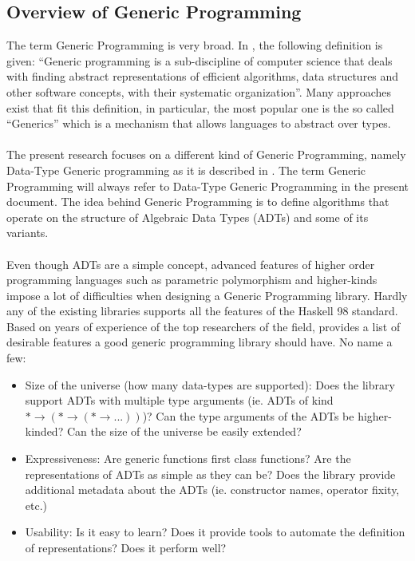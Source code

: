 \documentclass[8pt]{extarticle}
\begin{document}
\subsection{Overview of Generic Programming}
The term Generic Programming is very broad. In \cite{GenLangComp}, the following definition is given: ``Generic programming is a sub-discipline of computer science that deals with finding abstract representations of efficient algorithms, data structures and other software concepts, with their systematic organization''. Many approaches exist that fit this definition, in particular, the most popular one is the so called ``Generics''\cite{GenLangComp} which is a mechanism that allows languages to abstract over types.
\\\\
The present research focuses on a different kind of Generic Programming, namely Data-Type Generic programming as it is described in \cite{CompGen}. The term Generic Programming will always refer to Data-Type Generic Programming in the present document. The idea behind Generic Programming is to define algorithms that operate on the structure of Algebraic Data Types (ADTs) and some of its variants.
\\\\
Even though ADTs are a simple concept, advanced features of higher order programming languages such as parametric polymorphism and higher-kinds impose a lot of difficulties when designing a Generic Programming library. Hardly any of the existing libraries \cite{CompGen} supports all the features of the Haskell 98 standard. Based on years of experience of the top researchers of the field, \cite{CompGen} provides a list of desirable features a good generic programming library should have. No name a few:
\begin{itemize}
\item Size of the universe (how many data-types are supported): Does the library support ADTs with multiple type arguments (ie. ADTs of kind $*\to (* \to (*\to ...))$)? Can the type arguments of the ADTs be higher-kinded? Can the size of the universe be easily extended?
\item Expressiveness: Are generic functions first class functions? Are the representations of ADTs as simple as they can be? Does the library provide additional metadata about the ADTs (ie. constructor names, operator fixity, etc.)
\item Usability: Is it easy to learn? Does it provide tools to automate the definition of representations? Does it perform well?
\end{itemize}
\end{document}
